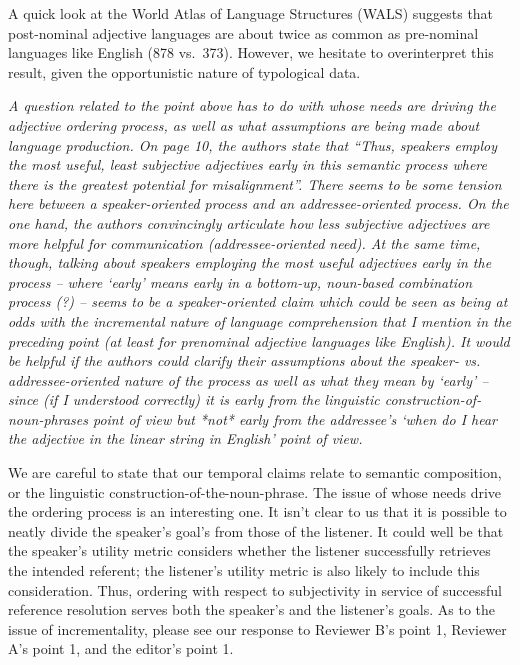 \documentclass[12pt]{article}
\newcommand{\gcs}[1]{\textcolor{blue}{[gcs: #1]}}
\begin{document}
A quick look at the World Atlas of Language Structures (WALS) suggests that post-nominal adjective languages are about twice as common as pre-nominal languages like English (878 vs.~373). However, we hesitate to overinterpret this result, given the opportunistic nature of typological data.

\item \emph{A question related to the point above has to do with whose needs are driving the adjective ordering process, as well as what assumptions are being made
about language production. On page 10, the authors state that ``Thus,
speakers employ the most useful, least subjective adjectives early in this
semantic process where there is the greatest potential for misalignment''.
There seems to be some tension here between a speaker-oriented process and
an addressee-oriented process. On the one hand, the authors convincingly
articulate how less subjective adjectives are more helpful for communication
(addressee-oriented need). At the same time, though, talking about speakers
employing the most useful adjectives early in the process – where
`early' means early in a bottom-up, noun-based combination process (?)
– seems to be a speaker-oriented claim which could be seen as being at
odds with the incremental nature of language comprehension that I mention in
the preceding point (at least for prenominal adjective languages like
English).   It would be helpful if the authors could clarify their
assumptions about the speaker- vs. addressee-oriented nature of the process
as well as what they mean by `early'  – since (if I understood
correctly) it is early from the linguistic construction-of-noun-phrases
point of view but *not* early from the addressee's `when do I hear the
adjective in the linear string in English' point of view.}

We are careful to state that our temporal claims relate to semantic composition, or the linguistic construction-of-the-noun-phrase. The issue of whose needs drive the ordering process is an interesting one. It isn't clear to us that it is possible to neatly divide the speaker's goal's from those of the listener. It could well be that the speaker's utility metric considers whether the listener successfully retrieves the intended referent; the listener's utility metric is also likely to include this consideration. Thus, ordering with respect to subjectivity in service of successful reference resolution serves both the speaker's and the listener's goals. %
As to the issue of incrementality, please see our response to Reviewer B's point 1, Reviewer A's point 1, and the editor's point 1. 
\end{document}
